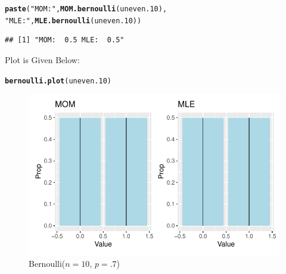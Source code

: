 \documentclass{article}\usepackage[]{graphicx}\usepackage[]{color}
\makeatletter
\def\maxwidth{ %
  \ifdim\Gin@nat@width>\linewidth
    \linewidth
  \else
    \Gin@nat@width
  \fi
}
\newcommand{\hlstr}[1]{\textcolor[rgb]{0.192,0.494,0.8}{#1}}%
\newcommand{\hlstd}[1]{\textcolor[rgb]{0.345,0.345,0.345}{#1}}%
\newcommand{\hlkwd}[1]{\textcolor[rgb]{0.737,0.353,0.396}{\textbf{#1}}}%
\newenvironment{kframe}{%
 \def\at@end@of@kframe{}%
 \ifinner\ifhmode%
  \def\at@end@of@kframe{\end{minipage}}%
  \begin{minipage}{\columnwidth}%
 \fi\fi%
 \def\FrameCommand##1{\hskip\@totalleftmargin \hskip-\fboxsep
 \colorbox{shadecolor}{##1}\hskip-\fboxsep
     \hskip-\linewidth \hskip-\@totalleftmargin \hskip\columnwidth}%
 \MakeFramed {\advance\hsize-\width
   \@totalleftmargin\z@ \linewidth\hsize
   \@setminipage}}%
 {\par\unskip\endMakeFramed%
 \at@end@of@kframe}
\newenvironment{knitrout}{}{} %
\makeatother
\begin{document}
\begin{enumerate}
\begin{enumerate}
\begin{knitrout}
\begin{kframe}
\begin{alltt}
\hlkwd{paste}\hlstd{(}\hlstr{"MOM: "}\hlstd{,} \hlkwd{MOM.bernoulli}\hlstd{(uneven.10),}
      \hlstr{"MLE: "}\hlstd{,} \hlkwd{MLE.bernoulli}\hlstd{(uneven.10))}
\end{alltt}
\begin{verbatim}
## [1] "MOM:  0.5 MLE:  0.5"
\end{verbatim}
\end{kframe}
\end{knitrout}
Plot is Given Below:
\begin{knitrout}
\color{fgcolor}\begin{kframe}
\begin{alltt}
\hlkwd{bernoulli.plot}\hlstd{(uneven.10)}
\end{alltt}
\end{kframe}
\end{knitrout}
\begin{figure}[H]
  \begin{center}
\begin{knitrout}
\color{fgcolor}
\includegraphics[width=\maxwidth]{figure/unnamed-chunk-51-1} 
\end{knitrout}
    \caption{Bernoulli($n=10$, $p=.7$)}
    \label{p4plot2}%
  \end{center}
\end{figure}

\end{enumerate}
\end{enumerate}
\end{document}
